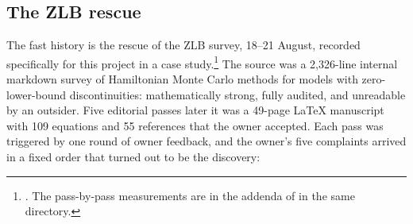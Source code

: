 \subsection{The ZLB rescue}
\label{sec:zlb}

The fast history is the rescue of the ZLB survey, 18--21 August, recorded
specifically for this project in a case
study.\footnote{. The pass-by-pass measurements are in the addenda of  in the same directory.}
The source was a 2{,}326-line internal markdown survey of Hamiltonian Monte
Carlo methods for models with zero-lower-bound discontinuities:
mathematically strong, fully audited, and unreadable by an outsider. Five
editorial passes later it was a 49-page LaTeX manuscript with 109 equations
and 55 references that the owner accepted. Each pass was triggered by one
round of owner feedback, and the owner's five complaints arrived in a fixed
order that turned out to be the discovery:

